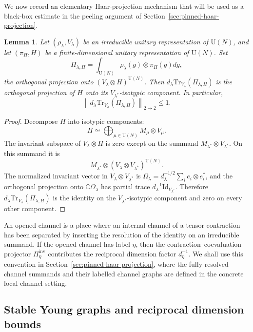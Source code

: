 \documentclass[11pt,a4paper,reqno]{amsart}
\newtheorem{lemma}[theorem]{Lemma}
\theoremstyle{definition}
\theoremstyle{remark}
\newcommand\U{{\mathrm U}}
\newcommand\Tr{{\mathrm{Tr}}}
\newcommand\Id{{\mathrm{Id}}}
\begin{document}
We now record an elementary Haar-projection mechanism that will be used as a black-box estimate in the peeling argument of Section~\ref{sec:pinned-haar-projection}.

\begin{lemma}\label{lem:partial-trace-haar-projection}
Let $(\rho_\lambda,V_\lambda)$ be an irreducible unitary representation of $\U(N)$, and let $(\pi_H,H)$ be a finite-dimensional unitary representation of $\U(N)$.  Set
\[
\Pi_{\lambda,H}=\int_{\U(N)}\rho_\lambda(g)\otimes\pi_H(g) dg,
\]
the orthogonal projection onto $(V_\lambda\otimes H)^{\U(N)}$.  Then $d_\lambda\Tr_{V_\lambda}(\Pi_{\lambda,H})$ is the orthogonal projection of $H$ onto its $V_{\lambda^*}$-isotypic component. In particular,
\[
\left\|d_\lambda\Tr_{V_\lambda}(\Pi_{\lambda,H})\right\|_{2\to2}\le1.
\]
\end{lemma}

\begin{proof}
Decompose $H$ into isotypic components:
\[
H\simeq\bigoplus_{\mu\in\widehat{\U(N)}}M_\mu\otimes V_\mu .
\]
The invariant subspace of $V_\lambda\otimes H$ is zero except on the summand $M_{\lambda^*}\otimes V_{\lambda^*}$.  On this summand it is
\[
M_{\lambda^*}\otimes (V_\lambda\otimes V_{\lambda^*})^{\U(N)}.
\]
The normalized invariant vector in $V_\lambda\otimes V_{\lambda^*}$ is $\Omega_\lambda=d_\lambda^{-1/2}\sum_i e_i\otimes e_i^*$, and the orthogonal projection onto $\mathbb C\Omega_\lambda$ has partial trace $d_\lambda^{-1}\Id_{V_{\lambda^*}}$.  Therefore $d_\lambda\Tr_{V_\lambda}(\Pi_{\lambda,H})$ is the identity on the $V_{\lambda^*}$-isotypic component and zero on every other component.
\end{proof}

An opened channel is a place where an internal channel of a tensor contraction has been separated by inserting the resolution of the identity on an irreducible summand. If the opened channel has label $\eta$, then the contraction--coevaluation projector $\Pi^{\mathrm{inv}}_\eta$ contributes the reciprocal dimension factor $d_\eta^{-1}$. We shall use this convention in Section~\ref{sec:pinned-haar-projection}, where the fully resolved channel summands and their labelled channel graphs are defined in the concrete local-channel setting.

\subsection{Stable Young graphs and reciprocal dimension bounds}
\label{subsec:stable-young-graphs}
\end{document}
